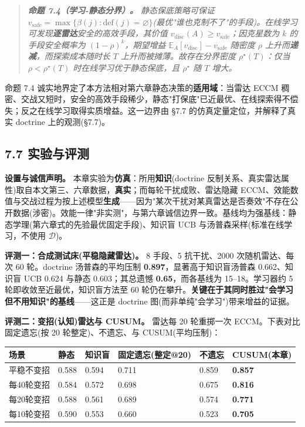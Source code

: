 \documentclass[12pt,a4paper]{ctexart}
\begin{document}
\begin{quote}\itshape \textbf{命题 7.4（学习-静态分界）。} 静态保底策略可保证 $v_{\mathrm{safe}}=\max\{\beta(j):\mathrm{def}(j)=\varnothing\}$(最优"谁也克制不了"的手段)。在线学习可发现\textbf{逐雷达}安全的高效手段，其价值 $v_{\mathrm{disc}}(A)\ge v_{\mathrm{safe}}$；因克星数为 $k$ 的手段安全概率为 $(1-\rho)^k$，期望增益 $\mathbb{E}_A[v_{\mathrm{disc}}]-v_{\mathrm{safe}}$ 随密度 $\rho$ 上升而\textbf{递减}，而探索成本随时长 $T$ 上升而被摊薄。故存在分界密度 $\rho^\star(T)$：仅当 $\rho<\rho^\star(T)$ 时在线学习优于静态保底，且 $\rho^\star$ 随 $T$ 增大。\end{quote}

命题 7.4 诚实地界定了本方法相对第六章静态决策的\textbf{适用域}：当雷达 ECCM 稠密、交战又短时，安全的高效手段稀少，静态"打保底"已近最优、在线探索得不偿失；反之在线学习取得实质增益。这一边界由 §7.7 的仿真定量定位，并解释了真实 doctrine 上的观测(§7.7)。


\subsection*{7.7 实验与评测}

\textbf{设置与诚信声明。} 本章实验为\textbf{仿真}：所用\textbf{知识}(doctrine 反制关系、真实雷达属性)取自本文第三、六章数据，\textbf{真实}；而每轮干扰成败、雷达隐藏 ECCM、效能数值与交战过程为按上述模型\textbf{生成}——因为"某次干扰对某真雷达是否奏效"不存在公开数据(涉密)。效能一律"非实测"，与第六章诚信边界一致。基线均为强基线：静态学理(第六章式的先验最优固定手段)、知识盲 UCB 与汤普森采样(标准在线学习，不使用 $\mathcal{D}$)。

\textbf{评测一：合成测试床(平稳隐藏雷达)。} 8 手段、5 抗干扰、2000 次随机雷达、每次 60 轮。doctrine 汤普森的平均压制 \textbf{0.897}，显著高于知识盲汤普森 0.662、知识盲 UCB 0.624 与静态 0.603；其总遗憾 \textbf{0.65}，而各基线为 15–18。学习器约 5 轮即收敛至近最优，知识盲方法至 60 轮仍在攀升。\textbf{关键在于其同时胜过"会学习但不用知识"的基线}——这正是 doctrine 图(而非单纯"会学习")带来增益的证据。

\textbf{评测二：变招(认知)雷达与 CUSUM。} 雷达每 20 轮重掷一次 ECCM。下表对比固定遗忘(按 20 轮整定)、不遗忘、与 CUSUM(平均压制)：

\begin{center}\small
\begin{tabular}{|p{}|p{}|p{}|p{}|p{}|p{}|}
\hline
\textbf{场景} & \textbf{静态} & \textbf{知识盲} & \textbf{固定遗忘(整定@20)} & \textbf{不遗忘} & \textbf{CUSUM(本章)} \\ \hline
平稳不变招 & 0.588 & 0.594 & 0.711 & 0.859 & \textbf{0.857} \\ \hline
每40轮变招 & 0.584 & 0.572 & 0.698 & 0.675 & \textbf{0.816} \\ \hline
每20轮变招 & 0.588 & 0.561 & 0.689 & 0.574 & \textbf{0.771} \\ \hline
每10轮变招 & 0.590 & 0.553 & 0.660 & 0.523 & \textbf{0.705} \\ \hline
\end{tabular}
\end{center}
\end{document}
